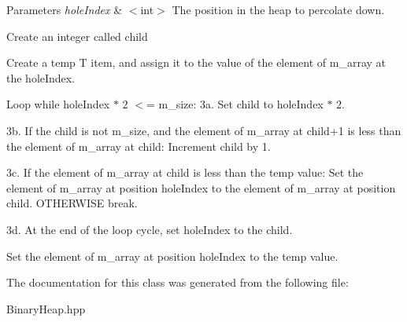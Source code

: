 \begin{DoxyParams}{Parameters}
{\em hole\+Index} & $<$int$>$ The position in the heap to percolate down.\\
\hline
\end{DoxyParams}

\begin{DoxyEnumerate}
\item Create an integer called child
\item Create a temp T item, and assign it to the value of the element of m\+\_\+array at the hole\+Index.
\item Loop while hole\+Index $\ast$ 2 $<$= m\+\_\+size\+: 3a. Set child to hole\+Index $\ast$ 2.

3b. If the child is not m\+\_\+size, and the element of m\+\_\+array at child+1 is less than the element of m\+\_\+array at child\+: Increment child by 1.

3c. If the element of m\+\_\+array at child is less than the temp value\+: Set the element of m\+\_\+array at position hole\+Index to the element of m\+\_\+array at position child. O\+T\+H\+E\+R\+W\+I\+SE break.

3d. At the end of the loop cycle, set hole\+Index to the child.
\item Set the element of m\+\_\+array at position hole\+Index to the temp value. 
\end{DoxyEnumerate}

The documentation for this class was generated from the following file\+:\begin{DoxyCompactItemize}
\item 
Binary\+Heap.\+hpp\end{DoxyCompactItemize}
